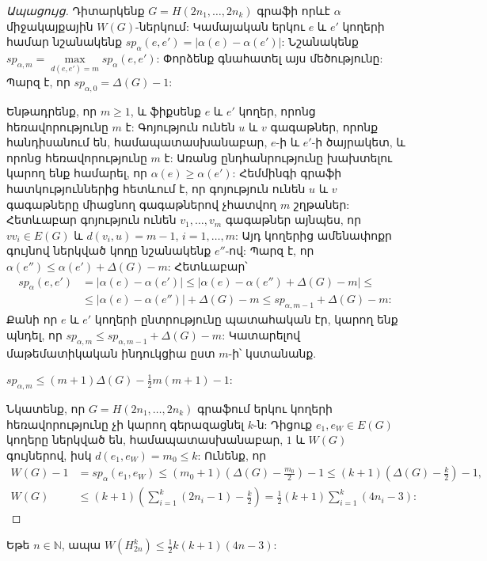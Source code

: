 \begin{proof}[Ապացույց]
Դիտարկենք $G=H(2n_1,\ldots,2n_k)$ գրաֆի որևէ $\alpha$ միջակայքային $W(G)$-ներկում: Կամայական երկու $e$ և $e'$ կողերի համար նշանակենք $sp_{\alpha}(e,e') = |\alpha(e) - \alpha(e')|$: Նշանակենք $sp_{\alpha,m} = \max\limits_{d(e,e')=m}{sp_{\alpha}(e,e')}$: Փորձենք գնահատել այս մեծությունը: Պարզ է, որ $sp_{\alpha,0} = \Delta(G)-1$: 

Ենթադրենք, որ $m \geq 1$, և ֆիքսենք $e$ և $e'$ կողեր, որոնց հեռավորությունը $m$ է: Գոյություն ունեն $u$ և $v$ գագաթներ, որոնք հանդիսանում են, համապատասխանաբար, $e$-ի և $e'$-ի ծայրակետ, և որոնց հեռավորությունը $m$ է: Առանց ընդհանրությունը խախտելու կարող ենք համարել, որ $\alpha(e) \geq \alpha(e')$: Հեմմինգի գրաֆի հատկություններից հետևում է, որ գոյություն ունեն $u$ և $v$ գագաթները միացնող գագաթներով չհատվող $m$ շղթաներ: Հետևաբար գոյություն ունեն $v_1, \ldots, v_m$ գագաթներ այնպես, որ $vv_i \in E(G)$ և $d(v_i,u)=m-1$, $i=1,\ldots,m$:  Այդ կողերից ամենափոքր գույնով ներկված կողը նշանակենք $e''$-ով: Պարզ է, որ $\alpha(e'') \leq \alpha(e') + \Delta(G) - m$: Հետևաբար՝
\begin{align*}
sp_{\alpha}(e, e') &= |\alpha(e) - \alpha(e')| \leq |\alpha(e) - \alpha(e'') + \Delta(G) - m| \leq \\
& \leq |\alpha(e)-\alpha(e'')| + \Delta(G) -m \leq sp_{\alpha,m-1} + \Delta(G) - m:
\end{align*}
Քանի որ $e$ և $e'$ կողերի ընտրությունը պատահական էր, կարող ենք պնդել, որ $sp_{\alpha,m} \leq sp_{\alpha,m-1} + \Delta(G) - m$: Կատարելով մաթեմատիկական ինդուկցիա ըստ $m$-ի՝ կստանանք.
\begin{center}
$sp_{\alpha,m} \leq (m+1)\Delta(G)-\frac{1}{2}m(m+1) - 1$:
\end{center}

Նկատենք, որ $G=H(2n_1, \ldots, 2n_k)$ գրաֆում երկու կողերի հեռավորությունը չի կարող գերազացնել $k$-ն: Դիցուք $e_1,e_W \in E(G)$ կողերը ներկված են, համապատասխանաբար, $1$ և $W(G)$ գույներով, իսկ $d(e_1,e_W)=m_0 \leq k$: Ունենք, որ
\begin{align*}
W(G)-1 &= sp_{\alpha}(e_1,e_W) \leq (m_0+1)\left(\Delta(G) - \frac{m_0}{2}\right) - 1 \leq (k+1)\left(\Delta(G) - \frac{k}{2}\right) - 1,\\
W(G) &\leq (k+1)\left(\sum\limits_{i=1}^{k}{(2n_i-1)} - \frac{k}{2}\right) = \frac{1}{2}(k+1)\sum\limits_{i=1}^{k}{(4n_i-3)}:
\end{align*}
\end{proof}


\begin{corollary}
\label{c2_Hamming_balanced_upper} Եթե $n \in \mathbb{N}$, ապա 
$W(H_{2n}^k) \leq \frac{1}{2}k(k+1)(4n-3)$:
\end{corollary}

